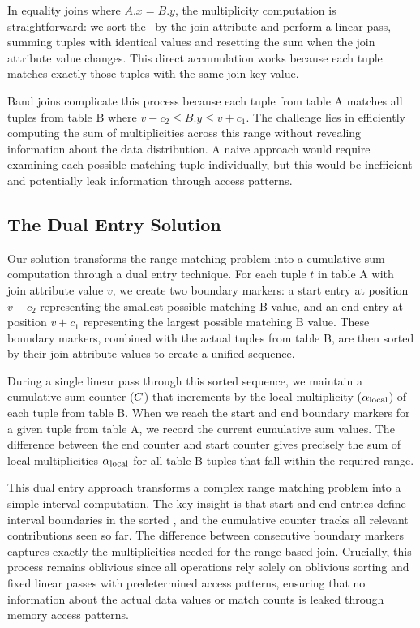In equality joins where $A.x = B.y$, the multiplicity computation is straightforward: we sort the \combinedtables\ by the join attribute and perform a linear pass, summing tuples with identical values and resetting the sum when the join attribute value changes. This direct accumulation works because each tuple matches exactly those tuples with the same join key value.

Band joins complicate this process because each tuple from table A matches all tuples from table B where $v - c_2 \leq B.y \leq v + c_1$. The challenge lies in efficiently computing the sum of multiplicities across this range without revealing information about the data distribution. A naive approach would require examining each possible matching tuple individually, but this would be inefficient and potentially leak information through access patterns.

\subsection{The Dual Entry Solution}

Our solution transforms the range matching problem into a cumulative sum computation through a dual entry technique. For each tuple $t$ in table A with join attribute value $v$, we create two boundary markers: a start entry at position $v - c_2$ representing the smallest possible matching B value, and an end entry at position $v + c_1$ representing the largest possible matching B value. These boundary markers, combined with the actual tuples from table B, are then sorted by their join attribute values to create a unified sequence.

During a single linear pass through this sorted sequence, we maintain a cumulative sum counter ($C$) that increments by the local multiplicity ($\alpha_{\text{local}}$) of each tuple from table B. When we reach the start and end boundary markers for a given tuple from table A, we record the current cumulative sum values. The difference between the end counter and start counter gives precisely the sum of local multiplicities $\alpha_{\text{local}}$ for all table B tuples that fall within the required range.

This dual entry approach transforms a complex range matching problem into a simple interval computation. The key insight is that start and end entries define interval boundaries in the sorted \combinedtable, and the cumulative counter tracks all relevant contributions seen so far. The difference between consecutive boundary markers captures exactly the multiplicities needed for the range-based join. Crucially, this process remains oblivious since all operations rely solely on oblivious sorting and fixed linear passes with predetermined access patterns, ensuring that no information about the actual data values or match counts is leaked through memory access patterns.

